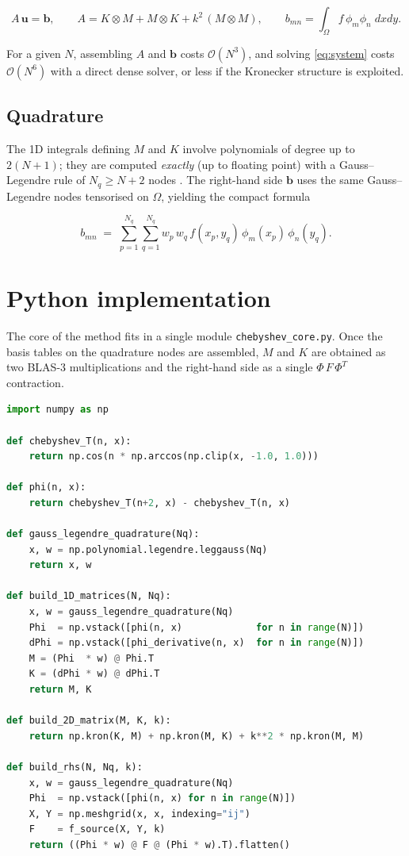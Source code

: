 \documentclass[11pt,a4paper,twoside,pdf]{article}
\numberwithin{equation}{section}
\begin{document}
\begin{equation}
\label{eq:system}
\boxed{
A\,\mathbf{u} = \mathbf{b},
\qquad
A = K \otimes M + M \otimes K + k^{2}\,(M \otimes M),
\qquad
b_{mn} = \int_{\Omega} f\,\phi_{m}\phi_{n} \; dxdy.
}
\end{equation}

For a given $N$, assembling $A$ and $\mathbf{b}$ costs
$\mathcal{O}(N^{3})$, and solving \eqref{eq:system} costs
$\mathcal{O}(N^{6})$ with a direct dense solver, or less if the
Kronecker structure is exploited.

\subsection{Quadrature}

The 1D integrals defining $M$ and $K$ involve polynomials of degree up
to $2(N+1)$; they are computed \emph{exactly} (up to floating point)
with a Gauss--Legendre rule of $N_{q} \ge N+2$ nodes
\cite{canuto2006spectral}. The right-hand side $\mathbf{b}$ uses the
same Gauss--Legendre nodes tensorised on $\Omega$, yielding the
compact formula

\[
b_{mn}
\;=\;
\sum_{p=1}^{N_{q}} \sum_{q=1}^{N_{q}}
w_{p}\,w_{q}\, f(x_{p},y_{q})\,\phi_{m}(x_{p})\,\phi_{n}(y_{q}).
\]

\section{Python implementation}
\label{sec:impl}

The core of the method fits in a single module
\texttt{chebyshev\_core.py}. Once the basis tables on the quadrature
nodes are assembled, $M$ and $K$ are obtained as two BLAS-3
multiplications and the right-hand side as a single
$\Phi\,F\,\Phi^{T}$ contraction.

\begin{lstlisting}[language=Python, caption={Core assembly routines.}]
import numpy as np

def chebyshev_T(n, x):
    return np.cos(n * np.arccos(np.clip(x, -1.0, 1.0)))

def phi(n, x):
    return chebyshev_T(n+2, x) - chebyshev_T(n, x)

def gauss_legendre_quadrature(Nq):
    x, w = np.polynomial.legendre.leggauss(Nq)
    return x, w

def build_1D_matrices(N, Nq):
    x, w = gauss_legendre_quadrature(Nq)
    Phi  = np.vstack([phi(n, x)             for n in range(N)])
    dPhi = np.vstack([phi_derivative(n, x)  for n in range(N)])
    M = (Phi  * w) @ Phi.T
    K = (dPhi * w) @ dPhi.T
    return M, K

def build_2D_matrix(M, K, k):
    return np.kron(K, M) + np.kron(M, K) + k**2 * np.kron(M, M)

def build_rhs(N, Nq, k):
    x, w = gauss_legendre_quadrature(Nq)
    Phi  = np.vstack([phi(n, x) for n in range(N)])
    X, Y = np.meshgrid(x, x, indexing="ij")
    F    = f_source(X, Y, k)
    return ((Phi * w) @ F @ (Phi * w).T).flatten()
\end{lstlisting}
\end{document}
